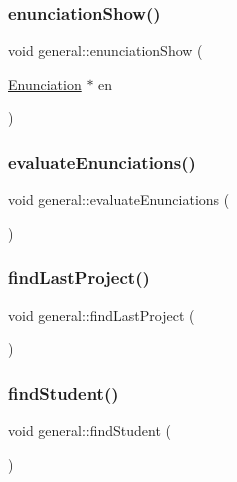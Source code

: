 \subsubsection{\texorpdfstring{enunciation\+Show()}{enunciationShow()}}
{\footnotesize\ttfamily void general\+::enunciation\+Show (\begin{DoxyParamCaption}\item[{\hyperlink{class_enunciation}{Enunciation} $\ast$}]{en }\end{DoxyParamCaption})}

\mbox{\label{classgeneral_a81fb58747c318f62bbd352e2a2bc31e0}} 
\subsubsection{\texorpdfstring{evaluate\+Enunciations()}{evaluateEnunciations()}}
{\footnotesize\ttfamily void general\+::evaluate\+Enunciations (\begin{DoxyParamCaption}{ }\end{DoxyParamCaption})}

\mbox{\label{classgeneral_abf69d2951e72f3d5197bedc1d4baf832}} 
\subsubsection{\texorpdfstring{find\+Last\+Project()}{findLastProject()}}
{\footnotesize\ttfamily void general\+::find\+Last\+Project (\begin{DoxyParamCaption}{ }\end{DoxyParamCaption})}

\mbox{\label{classgeneral_a7afc234dd64c7d7aa6caa64fa3029c5c}} 
\subsubsection{\texorpdfstring{find\+Student()}{findStudent()}}
{\footnotesize\ttfamily void general\+::find\+Student (\begin{DoxyParamCaption}{ }\end{DoxyParamCaption})}

